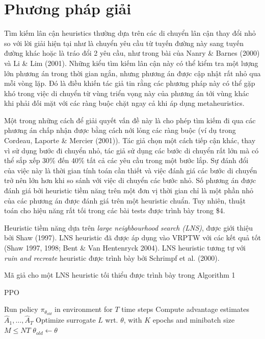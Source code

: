 \chapter{Phương pháp giải}
Tìm kiếm lân cận heuristics thường dựa trên các di chuyển lân cận thay đổi nhỏ so với lời giải hiện tại như là chuyển yêu cầu từ tuyến đường này sang tuyến đường khác hoặc là tráo đổi 2 yêu cầu, như trong bài của Nanry \& Barnes (2000) và Li \& Lim (2001). Những kiểu tìm kiếm lân cận này có thể kiểm tra một lượng lớn phương án trong thời gian ngắn, nhưng phương án được cập nhật rất nhỏ qua mỗi vòng lặp. Đó là điều khiến tác giả tin rằng các phương pháp này có thể gặp khó trong việc di chuyển từ vùng triển vọng này của phương án tới vùng khác khi phải đối mặt với các ràng buộc chặt ngay cả khi áp dụng metaheuristics.

Một trong những cách để giải quyết vấn đề này là cho phép tìm kiếm đi qua các phương án chấp nhận được bằng cách nới lỏng các ràng buộc (ví dụ trong Cordeau, Laporte \& Mercier (2001)). Tác giả chọn một cách tiếp cận khác, thay vì sử dụng bước đi chuyển nhỏ, tác giả sử dụng các bước di chuyển rất lớn mà có thể sắp xếp 30\% đến 40\% tất cả các yêu cầu trong một bước lắp. Sự đánh đổi của việc này là thời gian tính toán cần thiết và việc đánh giá các bước di chuyển trở nên lớn hơn khi so sánh với việc di chuyển các bước nhỏ. Số phương án được đánh giá bởi heuristic tiềm năng trên một đơn vị thời gian chỉ là một phần nhỏ của các phương án được đánh giá trên một heuristic chuẩn. Tuy nhiên, thuật toán cho hiệu năng rất tối trong các bài tests được trình bày trong \$4.

Heuristic tiềm năng dựa trên \textit{large neighbourhood search (LNS)}, được giới thiệu bởi Shaw (1997). LNS heuristic đã được áp dụng vào VRPTW với các kết quả tốt (Shaw 1997, 1998; Bent \& Van Hentenryck 2004). LNS heuristic tương tự với \textit{ruin and recreate} heuristic được trình bày bởi Schrimpf et al. (2000).

Mã giả cho một LNS heuristic tối thiểu được trình bày trong Algorithm 1

\begin{algorithm}
	\caption{PPO} 
	\begin{algorithmic}[1]
				\State Run policy $\pi_{\theta_{old}}$ in environment for $T$ time steps
				\State Compute advantage estimates $\hat{A}_{1},\ldots,\hat{A}_{T}$
			\EndFor
			\State Optimize surrogate $L$ wrt. $\theta$, with $K$ epochs and minibatch size $M\leq NT$
			\State $\theta_{old}\leftarrow\theta$
		\EndFor
	\end{algorithmic} 
\end{algorithm}